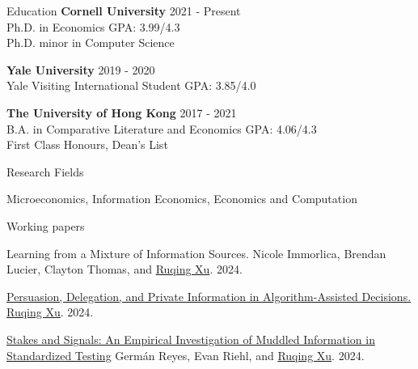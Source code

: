 \documentclass{resume} %
\begin{document}

\begin{rSection}{Education}
{\bf Cornell University} \hfill {2021 - Present} 
\\ Ph.D. in Economics \hfill {GPA: 3.99/4.3} \\
Ph.D. minor in Computer Science \hfill

{\bf Yale University} \hfill {2019 - 2020} 
\\ Yale Visiting International Student \hfill {GPA: 3.85/4.0}

{\bf The University of Hong Kong} \hfill {2017 - 2021} 
\\ B.A. in Comparative Literature and Economics \hfill {GPA: 4.06/4.3}
\\ First Class Honours, Dean's List

\end{rSection}

\begin{rSection}{Research Fields} \itemsep -10pt
\item Microeconomics, Information Economics, Economics and Computation
\end{rSection}

\begin{rSection}{Working papers}

Learning from a Mixture of Information Sources. Nicole Immorlica, Brendan Lucier, Clayton Thomas, and \underline{Ruqing Xu}. 2024.

\href{https://ruqing-xu.github.io/assets/pdf/delegation_xu.pdf}{Persuasion, Delegation, and Private Information in Algorithm-Assisted Decisions.} \underline{Ruqing Xu}. 2024.

\href{https://ruqing-xu.github.io/assets/pdf/rrx_stakes_june2024.pdf}{Stakes and Signals: An Empirical Investigation of Muddled
Information in Standardized Testing} Germán Reyes, Evan Riehl, and \underline{Ruqing Xu}. 2024.



\end{rSection}
\end{document}
